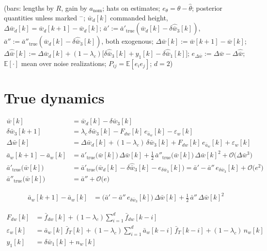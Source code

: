 \documentclass[11pt,a4paper,fontset=none]{ctexart}
\newcommand{\ba}{\bar{a}}
\newcommand{\bw}{\bar{w}}
\newcommand{\E}{\mathbb{E}}
\newcommand{\dW}{\Delta\bw}
\newcommand{\dWh}{\Delta\hat{\bw}}
\newcommand{\eD}{e_{\Delta\bw}}
\newcommand{\ap}{\ba'}
\newcommand{\app}{\ba''}
\begin{document}
(bars: lengths by $R$, gain by $a_{\mathrm{nom}}$; hats on estimates;
$e_{\theta} = \theta - \hat{\theta}$; posterior quantities unless marked $^{-}$;
$\bw_d[k]$ commanded height, $\Delta\bw_d[k] = \bw_d[k+1] - \bw_d[k]$;
$\ap := \ap_{\mathrm{true}}(\bw_d[k] - \delta\hat{\bw}_3[k])$, $\app := \app_{\mathrm{true}}(\bw_d[k] - \delta\hat{\bw}_3[k])$, both exogenous;
$\dW[k] := \bw[k+1] - \bw[k]$; $\dWh[k] := \Delta\bw_d[k] + (1-\lambda_c)\bigl[\delta\hat{\bw}_3[k] + y_1[k] - \delta\hat{\bw}_1[k]\bigr]$;
$\eD := \dW - \dWh$;
$\E[\cdot]$ mean over noise realizations; $P_{ij} = \E[e_i e_j]$; $d = 2$)

\section{True dynamics}

\begin{align*}
\bw[k]            &= \bw_d[k] - \delta\bw_3[k] \\
\delta\bw_3[k+1]  &= \lambda_c\,\delta\bw_3[k] - F_{dw}[k]\,e_{\ba_w}[k] - \varepsilon_w[k] \\
\dW[k]            &= \Delta\bw_d[k] + (1-\lambda_c)\,\delta\bw_3[k] + F_{dw}[k]\,e_{\ba_w}[k] + \varepsilon_w[k] \\
\ba_w[k+1] - \ba_w[k] &= \ap_{\mathrm{true}}\bigl(\bw[k]\bigr)\,\dW[k]
                       + \tfrac{1}{2}\,\app_{\mathrm{true}}\bigl(\bw[k]\bigr)\,\dW[k]^{2} + \mathcal{O}\bigl(\dW^{3}\bigr) \\
\ap_{\mathrm{true}}\bigl(\bw[k]\bigr)  &= \ap_{\mathrm{true}}\bigl(\bw_d[k] - \delta\hat{\bw}_3[k] - e_{\delta\bw_3}[k]\bigr)
                                        = \ap - \app\,e_{\delta\bw_3}[k] + \mathcal{O}\bigl(e^{2}\bigr) \\
\app_{\mathrm{true}}\bigl(\bw[k]\bigr) &= \app + \mathcal{O}\bigl(e\bigr)
\end{align*}

\begin{align*}
\ba_w[k+1] - \ba_w[k] &= \bigl(\ap - \app\,e_{\delta\bw_3}[k]\bigr)\,\dW[k] + \tfrac{1}{2}\,\app\,\dW[k]^{2}
\end{align*}

\begin{align*}
F_{dw}[k]        &= \bar{f}_{dw}[k] + (1-\lambda_c)\sum_{i=1}^{d}\bar{f}_{dw}[k-i] \\
\varepsilon_w[k] &= \ba_w[k]\,\bar{f}_T[k] + (1-\lambda_c)\sum_{i=1}^{d}\ba_w[k-i]\,\bar{f}_T[k-i] + (1-\lambda_c)\,n_w[k] \\
y_1[k]           &= \delta\bw_1[k] + n_w[k]
\end{align*}
\end{document}
